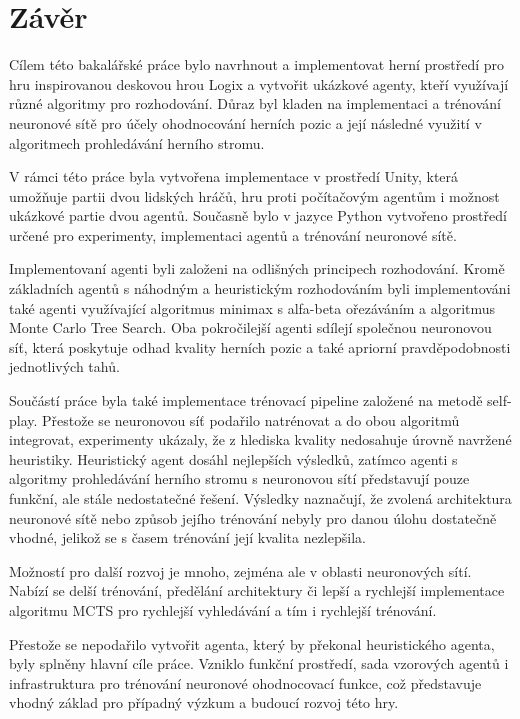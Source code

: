 \chapter*{Závěr}

Cílem této bakalářské práce bylo navrhnout a implementovat herní prostředí pro hru inspirovanou deskovou hrou Logix a vytvořit 
ukázkové agenty, kteří využívají různé algoritmy pro rozhodování. Důraz byl kladen na implementaci a trénování neuronové sítě
pro účely ohodnocování herních pozic a její následné využití v algoritmech prohledávání herního stromu.

V rámci této práce byla vytvořena implementace v prostředí Unity, která umožňuje partii dvou lidských hráčů, hru proti počítačovým agentům
i možnost ukázkové partie dvou agentů. Současně bylo v jazyce Python vytvořeno prostředí určené pro experimenty, implementaci agentů 
a trénování neuronové sítě. 

Implementovaní agenti byli založeni na odlišných principech rozhodování. Kromě základních agentů s náhodným a heuristickým rozhodováním byli implementováni 
také agenti využívající algoritmus minimax s alfa-beta ořezáváním a algoritmus Monte Carlo Tree Search. Oba pokročilejší agenti sdílejí
společnou neuronovou síť, která poskytuje odhad kvality herních pozic a také apriorní pravděpodobnosti jednotlivých tahů.

Součástí práce byla také implementace trénovací pipeline založené na metodě self-play. Přestože se neuronovou síť podařilo natrénovat
a do obou algoritmů integrovat, experimenty ukázaly, že z hlediska kvality nedosahuje úrovně navržené heuristiky. 
Heuristický agent dosáhl nejlepších výsledků, zatímco agenti s algoritmy prohledávání herního stromu s neuronovou sítí představují
pouze funkční, ale stále nedostatečné řešení. Výsledky naznačují, že zvolená architektura neuronové sítě nebo způsob jejího trénování nebyly pro 
danou úlohu dostatečně vhodné, jelikož se s časem trénování její kvalita nezlepšila.

Možností pro další rozvoj je mnoho, zejména ale v oblasti neuronových sítí. Nabízí se delší trénování, předělání architektury či lepší 
a rychlejší implementace algoritmu MCTS pro rychlejší vyhledávání a tím i rychlejší trénování.

Přestože se nepodařilo vytvořit agenta, který by překonal heuristického agenta, byly splněny hlavní cíle práce. Vzniklo funkční
prostředí, sada vzorových agentů i infrastruktura pro trénování neuronové ohodnocovací funkce, což představuje vhodný základ pro případný
výzkum a budoucí rozvoj této hry.